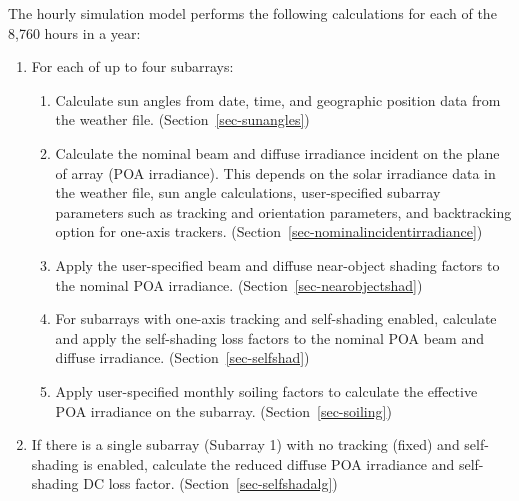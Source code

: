 \documentclass[12pt,letterpaper]{article}
\begin{document}
The hourly simulation model performs the following calculations for each of the 8,760 hours in a year:

\begin{enumerate}

\item{For each of up to four subarrays:}

  \begin{enumerate}

  \item{Calculate sun angles from date, time, and geographic position data from the weather file. (Section~\ref{sec-sunangles})} %

  \item{Calculate the nominal beam and diffuse irradiance incident on the plane of array (POA irradiance). This depends on the solar irradiance data in the weather file, sun angle calculations, user-specified subarray parameters such as tracking and orientation parameters, and backtracking option for one-axis trackers. (Section~\ref{sec-nominalincidentirradiance})} %

  \item{Apply the user-specified beam and diffuse near-object shading factors to the nominal POA irradiance. (Section~\ref{sec-nearobjectshad})} %

  \item{For subarrays with one-axis tracking and self-shading enabled, calculate and apply the self-shading loss factors to the nominal POA beam and diffuse irradiance. (Section~\ref{sec-selfshad})} %

  \item{Apply user-specified monthly soiling factors to calculate the effective POA irradiance on the subarray. (Section~\ref{sec-soiling})} %


  \end{enumerate}

\item{If there is a single subarray (Subarray 1) with no tracking (fixed) and self-shading is enabled, calculate the reduced diffuse POA irradiance and self-shading DC loss factor. (Section~\ref{sec-selfshadalg})} %


\end{enumerate}
\end{document}
